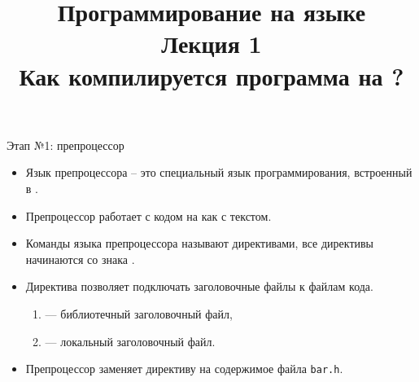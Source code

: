 \documentclass{beamer}
\title{{\bf Программирование на языке \langcpp\protect\\Лекция
1\protect\vspace{1em}\\}Как компилируется программа на \langcpp?}
\begin{document}
\begin{frame} 
  \titlepage
\end{frame}



\begin{frame}[fragile]{Этап №1: препроцессор}
\begin{itemize}
    \item Язык препроцессора -- это специальный язык программирования, 
        встроенный в \langcpp.

    \item Препроцессор работает с кодом на \langcpp как с текстом.

    \item Команды языка препроцессора называют директивами,              
        все директивы начинаются со знака \code{\#}.

    \item Директива  позволяет подключать заголовочные файлы к файлам
        кода.
    \begin{enumerate}
        \item {} --- библиотечный заголовочный файл,
        \item {} --- локальный заголовочный файл.
    \end{enumerate}
    \item Препроцессор заменяет директиву  на содержимое
    файла \texttt{bar.h}.
\end{itemize}

%

\end{frame}
\end{document}
